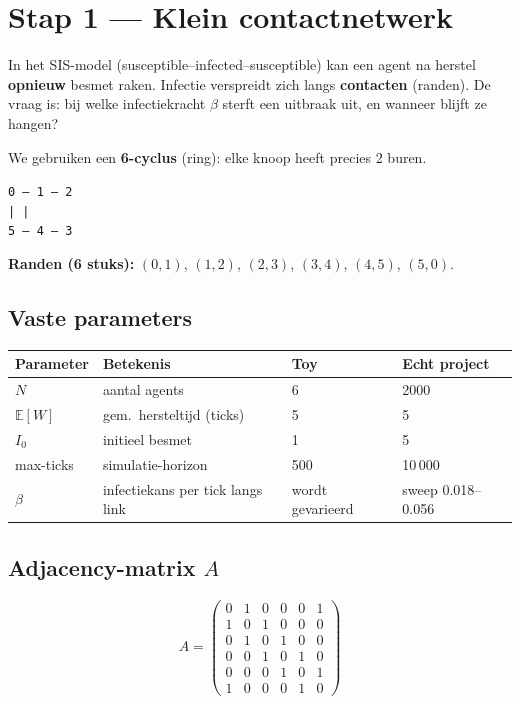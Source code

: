 \documentclass[11pt,a4paper]{article}
\begin{document}
\section{Stap 1 --- Klein contactnetwerk}

In het SIS-model (susceptible--infected--susceptible) kan een agent na herstel \textbf{opnieuw} besmet raken. Infectie verspreidt zich langs \textbf{contacten} (randen). De vraag is: bij welke infectiekracht $\beta$ sterft een uitbraak uit, en wanneer blijft ze hangen?

We gebruiken een \textbf{6-cyclus} (ring): elke knoop heeft precies 2 buren.

\begin{center}
\texttt{0 --- 1 --- 2}\\
\texttt{| \hspace{3.2em} |}\\
\texttt{5 --- 4 --- 3}
\end{center}

\textbf{Randen (6 stuks):} $(0,1)$, $(1,2)$, $(2,3)$, $(3,4)$, $(4,5)$, $(5,0)$.

\subsection*{Vaste parameters}

\begin{center}
\begin{tabular}{@{}llll@{}}
\toprule
Parameter & Betekenis & Toy & Echt project \\
\midrule
$N$ & aantal agents & 6 & 2000 \\
$\mathbb{E}[W]$ & gem.\ hersteltijd (ticks) & 5 & 5 \\
$I_0$ & initieel besmet & 1 & 5 \\
max-ticks & simulatie-horizon & 500 & 10\,000 \\
$\beta$ & infectiekans per tick langs link & wordt gevarieerd & sweep 0.018--0.056 \\
\bottomrule
\end{tabular}
\end{center}

\subsection*{Adjacency-matrix $A$}

\begin{center}
\[
A =
\begin{pmatrix}
0 & 1 & 0 & 0 & 0 & 1 \\
1 & 0 & 1 & 0 & 0 & 0 \\
0 & 1 & 0 & 1 & 0 & 0 \\
0 & 0 & 1 & 0 & 1 & 0 \\
0 & 0 & 0 & 1 & 0 & 1 \\
1 & 0 & 0 & 0 & 1 & 0
\end{pmatrix}
\]
\end{center}
\end{document}
